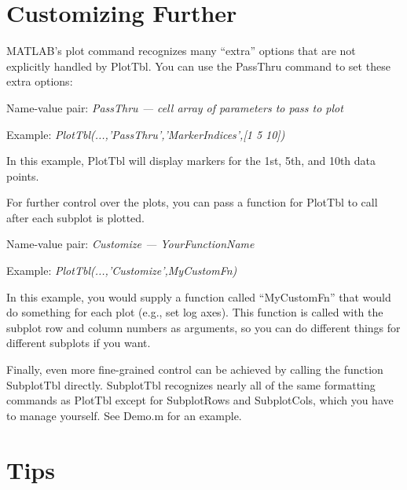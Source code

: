 \documentclass{article}
\newcommand{\example}[1]{Example: {\it #1}}
\newcommand{\namevalue}[2]{{\it #1 --- #2}}
\begin{document}
\section{Customizing Further}  %

MATLAB's plot command recognizes many ``extra'' options that are not explicitly handled by PlotTbl.
You can use the PassThru command to set these extra options:

Name-value pair: \namevalue{PassThru}{cell array of parameters to pass to plot}

\example{PlotTbl(...,'PassThru',{'MarkerIndices',[1 5 10]})}

In this example, PlotTbl will display markers for the 1st, 5th, and 10th data points.

For further control over the plots, you can pass a function for PlotTbl to
call after each subplot is plotted.

Name-value pair: \namevalue{Customize}{YourFunctionName}

\example{PlotTbl(...,'Customize',MyCustomFn)}

In this example, you would supply a function called ``MyCustomFn'' that would
do something for each plot (e.g., set log axes).
This function is called with the subplot row and column numbers as arguments,
so you can do different things for different subplots if you want.

Finally, even more fine-grained control can be achieved by calling the function SubplotTbl directly.
SubplotTbl recognizes nearly all of the same formatting commands as PlotTbl
except for SubplotRows and SubplotCols, which you have to manage yourself.
See Demo.m for an example.

\section{Tips}
\end{document}
